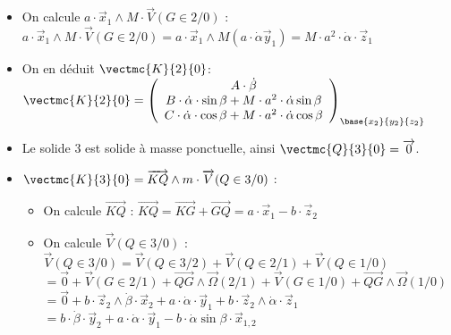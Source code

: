 \begin{multicols}{2}
\begin{corrige}
\begin{itemize}
\begin{itemize}
\item On calcule $a\cdot \overrightarrow{x}_1\wedge M\cdot \overrightarrow{V}(G\in 2/0)$ : 
$
a\cdot \overrightarrow{x}_1\wedge M\cdot \overrightarrow{V}(G\in 2/0)=
a\cdot \overrightarrow{x}_1\wedge M\left(a\cdot \dot{\alpha}\overrightarrow{y}_{1} \right)=
M\cdot a^2\cdot \dot{\alpha}\cdot \overrightarrow{z}_1
$

\item On en déduit $\vectmc{K}{2}{0}$: $
\vectmc{K}{2}{0}=\left(
\begin{array}{c}
A\cdot \dot{\beta}\\
B\cdot \dot{\alpha}\cdot \sin\beta+M\cdot a^2\cdot \dot{\alpha}\sin\beta\\
C\cdot \dot{\alpha}\cdot \cos\beta+M\cdot a^2\cdot \dot{\alpha}\cos\beta\\
\end{array}
\right)_{\base{{x}_2}{{y}_2}{{z}_2}}\\
$
\end{itemize}
\end{itemize}
\end{corrige}
\else
\fi


\ifprof
\begin{corrige}
\begin{itemize}
\item Le solide $3$ est solide à masse ponctuelle, ainsi $\vectmc{Q}{3}{0}=\overrightarrow{0}$.
\item $\vectmc{K}{3}{0}=\overrightarrow{KQ}\wedge m\cdot \overrightarrow{V}(Q\in 3/0)$ : 
\begin{itemize}
\item On calcule $\overrightarrow{KQ}$ : 
$
\overrightarrow{KQ}=\overrightarrow{KG}+\overrightarrow{GQ}=a\cdot \overrightarrow{x}_1-b\cdot \overrightarrow{z}_2
$
\item On calcule $\overrightarrow{V}(Q\in 3/0)$ : 
$
\overrightarrow{V}(Q\in 3/0)=\overrightarrow{V}(Q\in 3/2)+\overrightarrow{V}(Q\in 2/1)+\overrightarrow{V}(Q\in 1/0)
$
$=\overrightarrow{0}+\overrightarrow{V}(G\in 2/1)+\overrightarrow{QG}\wedge \overrightarrow{\Omega}(2/1)
+\overrightarrow{V}(G\in 1/0)+\overrightarrow{QG}\wedge \overrightarrow{\Omega}(1/0)$
$=\overrightarrow{0}+b\cdot \overrightarrow{z}_2\wedge \dot{\beta}\cdot \overrightarrow{x}_2+ a\cdot \dot{\alpha}\cdot \overrightarrow{y}_1+b\cdot \overrightarrow{z}_2\wedge \dot{\alpha}\cdot \overrightarrow{z}_1$
$=b\cdot \dot{\beta}\cdot \overrightarrow{y}_2+a\cdot \dot{\alpha}\cdot \overrightarrow{y}_1-b\cdot\dot{\alpha} \sin\beta\cdot \overrightarrow{x}_{1,2}$



\end{itemize}
\end{itemize}
\end{corrige}
\end{multicols}

